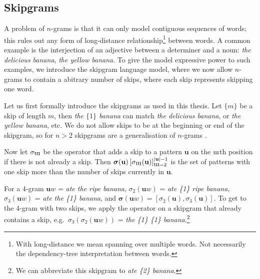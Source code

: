 \subsection{Skipgrams}
A problem of $n$-grams is that it can only model contiguous sequences of words; this rules out any form of long-distance relationship\footnote{With long-distance we mean spanning over multiple words. Not necessarily the dependency-tree interpretation between words.} between words. A common example is the interjection of an adjective between a determiner and a noun: \emph{the delicious banana}, \emph{the yellow banana}. To give the model expressive power to such examples, we introduce the skipgram language model, where we now allow $n$-grams to contain a abitrary number of skips, where each skip represents skipping one word. 

Let us first formally introduce the skipgrams as used in this thesis. Let $\{m\}$ be a skip of length $m$, then \emph{the $\{1\}$ banana} can match \emph{the delicious banana}, or \emph{the yellow banana}, etc. We do not allow skips to be at the beginning or end of the skipgram, so for $n>2$ skipgrams are a generalisation of $n$-grams \cite{goodman2001bit,shazeer2015sparse,Pickhardt2014GLM}.

Now let $\sigma_{\rotatebox[origin=c]{180}{m}}$ be the operator that adds a skip to a pattern $\mathbf{u}$ on the $\rotatebox[origin=c]{180}{m}$th position if there is not already a skip. Then $\boldsymbol\sigma(\mathbf{u}) \left[\sigma_{\rotatebox[origin=c]{180}{m}}(\mathbf{u})\right]_{\rotatebox[origin=c]{180}{m}=2}^{|\mathbf{u}|-1}$ is the set of patterns with one skip more than the number of skips currently in $\mathbf{u}$. 



For a 4-gram $\mathbf{u}w$ = \emph{ate the ripe banana}, $\sigma_2(\mathbf{u}w)$ = \emph{ate \{1\} ripe banana}, $\sigma_3(\mathbf{u}w)$ = \emph{ate the \{1\} banana}, and $\boldsymbol\sigma(\mathbf{u}w) = \left[\sigma_2(\mathbf{u}), \sigma_3(\mathbf{u})\right]$. To get to the 4-gram with two skips, we apply the operator on a skipgram that already contains a skip, e.g.~$\sigma_3(\sigma_2(\mathbf{u}w))$ = \emph{the \{1\} \{1\} banana}.\footnote{We can abbreviate this skipgram to \emph{ate \{2\} banana}.}

